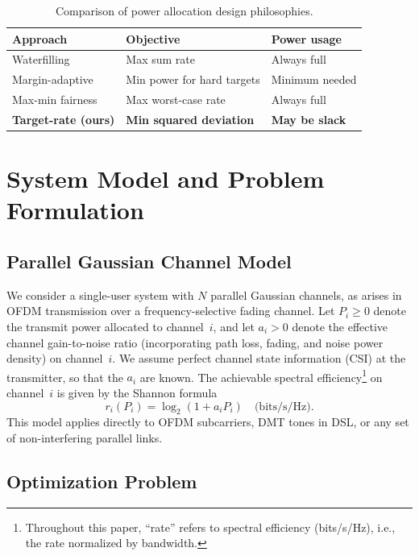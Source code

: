 \documentclass[journal]{IEEEtran}
\begin{document}
\begin{table}[t]
\centering
\caption{Comparison of power allocation design philosophies.}
\label{tab:positioning}
\begin{tabular}{lll}
\toprule
Approach & Objective & Power usage \\
\midrule
Waterfilling & Max sum rate & Always full \\
Margin-adaptive & Min power for hard targets & Minimum needed \\
Max-min fairness & Max worst-case rate & Always full \\
\textbf{Target-rate (ours)} & \textbf{Min squared deviation} & \textbf{May be slack} \\
\bottomrule
\end{tabular}
\end{table}

\section{System Model and Problem Formulation}
\label{sec:model}

\subsection{Parallel Gaussian Channel Model}

We consider a single-user system with $N$ parallel Gaussian channels, as arises in OFDM transmission over a frequency-selective fading channel.
Let $P_i \ge 0$ denote the transmit power allocated to channel~$i$, and let $a_i > 0$ denote the effective channel gain-to-noise ratio (incorporating path loss, fading, and noise power density) on channel~$i$.
We assume perfect channel state information (CSI) at the transmitter, so that the $a_i$ are known.
The achievable spectral efficiency\footnote{Throughout this paper, ``rate'' refers to spectral efficiency (bits/s/Hz), i.e., the rate normalized by bandwidth.} on channel~$i$ is given by the Shannon formula
\begin{equation}
r_i(P_i) = \log_2(1 + a_i P_i) \quad \text{(bits/s/Hz)}.
\label{eq:rate}
\end{equation}
This model applies directly to OFDM subcarriers, DMT tones in DSL, or any set of non-interfering parallel links.

\subsection{Optimization Problem}
\end{document}
